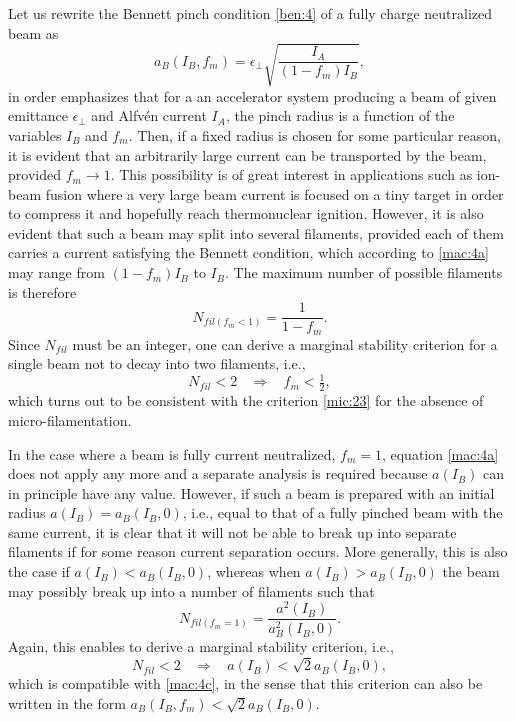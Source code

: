 \documentclass [12pt,a4paper,     ]{report} %
\newcommand{\Oh}{\tfrac{1}{2}}        %
\begin{document}
    Let us rewrite the Bennett pinch condition \eqref{ben:4} of a fully charge neutralized beam as
%
\begin{equation}\label{mac:4a} %
      a_B(I_B,f_m) = \epsilon_{\perp} \sqrt{\frac{I_A}{(1-f_m)I_B}},
\end{equation}
%
in order emphasizes that for a an accelerator system producing a beam of given emittance $\epsilon_{\perp}$ and Alfv\'en current $I_A$, the pinch radius is a function of the variables $I_B$ and $f_m$.  Then, if a fixed radius is chosen for some particular reason, it is evident that an arbitrarily large current can be transported by the beam, provided $f_m \rightarrow 1$.   This possibility is of great interest in applications such as ion-beam fusion where a very large beam current is focused on a tiny target in order to compress it and hopefully reach thermonuclear ignition.  However, it is also evident that such a beam may split into several filaments, provided each of them carries a current satisfying the Bennett condition, which according to \eqref{mac:4a} may range from $(1-f_m)I_B$ to $I_B$.  The maximum number of possible filaments is therefore
%
\begin{equation}\label{mac:4b} %
      N_{fil(f_m<1)} = \frac{1}{1-f_m}.
\end{equation}
%
Since $N_{fil}$ must be an integer, one can derive a marginal stability criterion for a single beam not to decay into two filaments, i.e.,
%
\begin{equation}\label{mac:4c} %
      N_{fil} < 2  ~~ ~~ \Longrightarrow ~~ ~~ f_m < \Oh,
\end{equation}
%
which turns out to be consistent with the criterion \eqref{mic:23} for the absence of micro-filamentation.

   In the case where a beam is fully current neutralized, $f_m=1$, equation \eqref{mac:4a} does not apply any more and a separate analysis is required because $a(I_B)$ can in principle have any value.  However, if such a beam is prepared with an initial radius $a(I_B) = a_B(I_B,0)$, i.e., equal to that of a fully pinched beam with the same current, it is clear that it will not be able to break up into separate filaments if for some reason current separation occurs.  More generally, this is also the case if $a(I_B) < a_B(I_B,0)$, whereas when $a(I_B) > a_B(I_B,0)$ the beam may possibly break up into a number of filaments such that
%
\begin{equation}\label{mac:4d} %
      N_{fil(f_m=1)} = \frac{a^2(I_B)}{a_B^2(I_B,0)}.
\end{equation}
%
Again, this enables to derive a marginal stability criterion, i.e.,
%
\begin{equation}\label{mac:4e} %
    N_{fil} < 2 ~~ ~~ \Longrightarrow ~~ ~~ a(I_B) < \sqrt{2}a_B(I_B,0),
\end{equation}
%
which is compatible with \eqref{mac:4c}, in the sense that this criterion can also be written in the form $a_B(I_B,f_m) < \sqrt{2}a_B(I_B,0)$.
\end{document}
